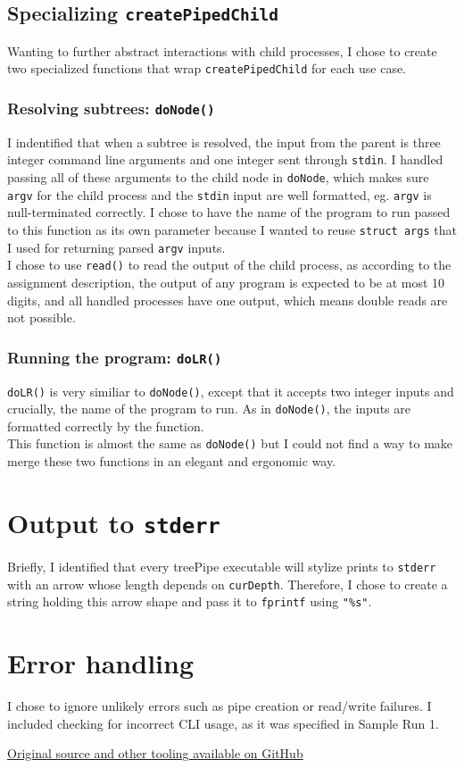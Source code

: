 \documentclass{article}
\begin{document}
\begin{multicols}{2}
\subsection{Specializing \texttt{createPipedChild}}
Wanting to further abstract interactions with child processes, I chose to create two specialized functions that wrap \verb|createPipedChild| for each use case. 
\subsubsection[Nodes]{Resolving subtrees: \texttt{doNode()}}
I indentified that when a subtree is resolved, the input from the parent is three integer command line arguments and one integer sent through \verb|stdin|. I handled passing all of these arguments to the child node in \verb|doNode|, which makes sure \verb|argv| for the child process and the \verb|stdin| input are well formatted, eg. \verb|argv| is null-terminated correctly. I chose to have the name of the program to run passed to this function as its own parameter because I wanted to reuse \verb|struct args| that I used for returning parsed \verb|argv| inputs.\\
I chose to use \verb|read()| to read the output of the child process, as according to the assignment description, the output of any program is expected to be at most 10 digits, and all handled processes have one output, which means double reads are not possible.
\subsubsection[Program]{Running the program: \texttt{doLR()}}
\verb|doLR()| is very similiar to \verb|doNode()|, except that it accepts two integer inputs and crucially, the name of the program to run. As in \verb|doNode()|, the inputs are formatted correctly by the function.\\
This function is almost the same as \verb|doNode()| but I could not find a way to make merge these two functions in an elegant and ergonomic way.
\section{Output to \texttt{stderr}}
Briefly, I identified that every treePipe executable will stylize prints to \verb|stderr| with an arrow whose length depends on \verb|curDepth|. Therefore, I chose to create a string holding this arrow shape and pass it to \verb|fprintf| using \verb|"%s"|.\section{Error handling}
I chose to ignore unlikely errors such as pipe creation or read/write failures. I included checking for incorrect CLI usage, as it was specified in Sample Run 1.
\end{multicols}
\centering\href{https://github.com/oralekin/CS307ProgrammingAssignments/tree/main/a1}{Original source and other tooling available on GitHub}
\end{document}
